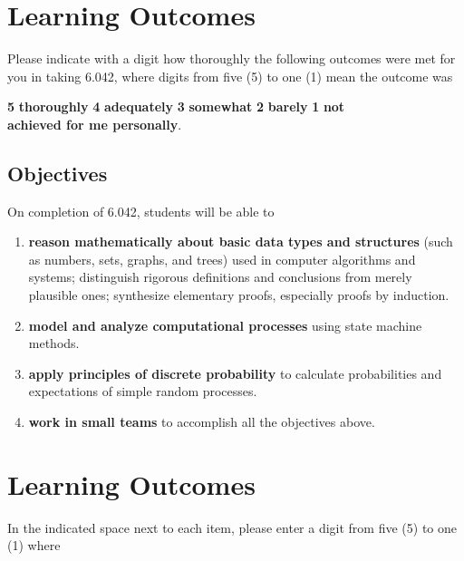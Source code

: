 \documentclass[handout]{mcs}
\begin{document}
\newpage
\section*{Learning Outcomes}

Please indicate with a digit how thoroughly the following outcomes
were met for you in taking 6.042, where digits from five (5) to one
(1) mean the outcome was
\begin{center}
\textbf{5}  \textbf{thoroughly} \qquad
\textbf{4}  \textbf{adequately}\qquad
\textbf{3} \textbf{somewhat}\qquad
\textbf{2} \textbf{barely}\qquad
\textbf{1} \textbf{not}\\

\textbf{achieved for me personally}.
\end{center}

\iffalse

\subsection{Objectives}
On completion of 6.042, students will be able to
\begin{enumerate}
\item
\label{Basic Discrete Mathematics Concepts}
\textbf{reason mathematically about basic data types and structures} (such
as numbers, sets, graphs, and trees) used in computer algorithms and
systems; distinguish rigorous definitions and conclusions from merely
plausible ones; synthesize elementary proofs, especially proofs by
induction.\brule{0.5in}

\item
\label{Computational Processes} 
\textbf{model and analyze computational processes} using state machine
methods.\brule{0.5in}

\item \label{Discrete Probability} \textbf{apply principles of discrete
probability} to calculate probabilities and expectations of simple random
processes.\brule{0.5in}

\item 
\label{teams} 
\textbf{work in small teams} to accomplish all the objectives above.\brule{0.5in}
\end{enumerate}

\section*{Learning Outcomes}

In the indicated space next to each item, please enter a digit from five
(5) to one (1) where
\end{document}
